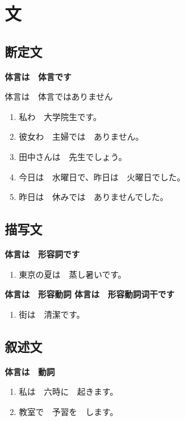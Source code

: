 \section{文}%
\label{sec:_}

\subsection{断定文}%

{\bf
\noindent 体言は　体言です

\noindent 体言は　体言ではありません
}

\begin{enumerate}
  \item 私わ　大学院生です。
  \item 彼女わ　主婦では　ありません。
  \item 田中さんは　先生でしょう。
  \item 今日は　水曜日で、昨日は　火曜日でした。
  \item 昨日は　休みでは　ありませんでした。
\end{enumerate}


\subsection{描写文}%

{\bf
\noindent 体言は　形容詞です
}

\begin{enumerate}
  \item 東京の夏は　蒸し暑いです。
\end{enumerate}

{\bf
\noindent 体言は　形容動詞
\noindent 体言は　形容動詞词干です
}

\begin{enumerate}
  \item 街は　清潔です。
\end{enumerate}


\subsection{叙述文}%

{\bf
\noindent 体言は　動詞
}

\begin{enumerate}
  \item 私は　六時に　起きます。
  \item 教室で　予習を　します。
\end{enumerate}


